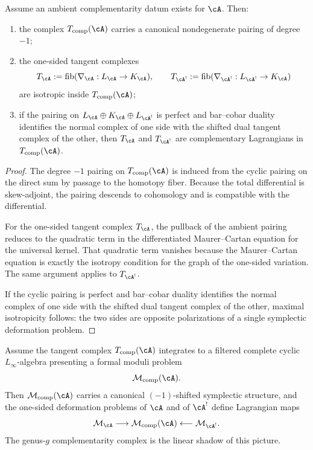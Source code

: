 \begin{theorem}
\label{thm:nms-ambient-complementarity-tangent}
Assume an ambient complementarity datum exists for $\cA$. Then:
\begin{enumerate}[label=\textup{(\roman*)}]
\item the complex $T_{\mathrm{comp}}(\cA)$ carries a canonical nondegenerate pairing of degree $-1$;
\item the one-sided tangent complexes
\[
T_{\cA}:=\mathrm{fib}(\nabla_{\cA}:L_{\cA}\to K_{\cA}),
\qquad
T_{\cA^!}:=\mathrm{fib}(\nabla_{\cA^!}:L_{\cA^!}\to K_{\cA})
\]
are isotropic inside $T_{\mathrm{comp}}(\cA)$;
\item if the pairing on $L_{\cA}\oplus K_{\cA}\oplus L_{\cA^!}$ is perfect and bar--cobar duality identifies the normal complex of one side with the shifted dual tangent complex of the other, then $T_{\cA}$ and $T_{\cA^!}$ are complementary Lagrangians in $T_{\mathrm{comp}}(\cA)$.
\end{enumerate}
\end{theorem}

\begin{proof}
The degree $-1$ pairing on $T_{\mathrm{comp}}(\cA)$ is induced from the cyclic pairing on the direct sum by passage to the homotopy fiber. Because the total differential is skew-adjoint, the pairing descends to cohomology and is compatible with the differential.

For the one-sided tangent complex $T_{\cA}$, the pullback of the ambient pairing reduces to the quadratic term in the differentiated Maurer--Cartan equation for the universal kernel. That quadratic term vanishes because the Maurer--Cartan equation is exactly the isotropy condition for the graph of the one-sided variation. The same argument applies to $T_{\cA^!}$.

If the cyclic pairing is perfect and bar--cobar duality identifies the normal complex of one side with the shifted dual tangent complex of the other, maximal isotropicity follows: the two sides are opposite polarizations of a single symplectic deformation problem.\qedhere
\end{proof}

\begin{theorem}
\label{thm:nms-ambient-complementarity-fmp}
Assume the tangent complex $T_{\mathrm{comp}}(\cA)$ integrates to a filtered complete cyclic $L_\infty$-algebra presenting a formal moduli problem
\[
\mathcal M_{\mathrm{comp}}(\cA).
\]
Then $\mathcal M_{\mathrm{comp}}(\cA)$ carries a canonical $(-1)$-shifted symplectic structure, and the one-sided deformation problems of $\cA$ and of $\cA^!$ define Lagrangian maps
\[
\mathcal M_{\cA}\longrightarrow \mathcal M_{\mathrm{comp}}(\cA)
\longleftarrow \mathcal M_{\cA^!}.
\]
The genus-$g$ complementarity complex is the linear shadow of this picture.
\end{theorem}

